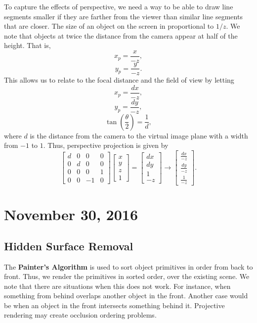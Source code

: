 \documentclass[11pt]{article}
\theoremstyle{plain} %
\theoremstyle{definition}
\theoremstyle{example}
\theoremstyle{remark}
\begin{document}
To capture the effects of perspective, we need a way to be able to draw line segments smaller if they are farther from the viewer than similar line segments that are closer. The size of an object on the screen in proportional to $1/z$. We note that objects at twice the distance from the camera appear at half of the height. That is, 
$$x_p = \frac{x}{-z},$$
$$y_p = \frac{y}{-z}.$$
This allows us to relate to the focal distance and the field of view by letting 
$$x_p = \frac{dx}{-z},$$
$$y_p = \frac{dy}{-z},$$
$$\tan\left(\frac{\theta}{2}\right) = \frac{1}{d},$$
where $d$ is the distance from the camera to the virtual image plane with a width from $-1$ to $1$. Thus, perspective projection is given by
$$\begin{bmatrix}d & 0 & 0 & 0 \\ 0 & d & 0 & 0 \\ 0 & 0 & 0 & 1 \\0 & 0 & -1 & 0\end{bmatrix}\begin{bmatrix}x \\y\\ z \\ 1\end{bmatrix} = \begin{bmatrix}dx \\ dy \\ 1 \\-z\end{bmatrix} \rightarrow \begin{bmatrix}\frac{dx}{-z}\\ \frac{dy}{-z} \\ \frac{1}{-z}\end{bmatrix}.$$

\section{November 30, 2016}



\subsection{Hidden Surface Removal}

The \textbf{Painter's Algorithm} is used to sort object primitives in order from back to front. Thus, we render the primitives in sorted order, over the existing scene. We note that there are situations when this does not work. For instance, when something from behind overlaps another object in the front. Another case would be when an object in the front intersects something behind it. Projective rendering may create occlusion ordering problems.
\end{document}
